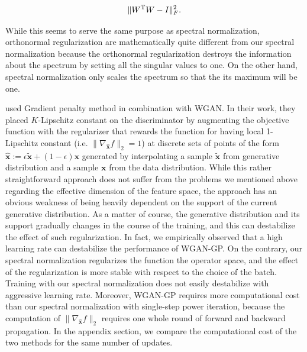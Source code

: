 \begin{align}
	\|W^{\rm T} W-I\|_F^2.
\end{align}

While this seems to serve the same purpose as spectral normalization, orthonormal regularization are mathematically quite different from our spectral normalization because the orthonormal regularization destroys the information about the spectrum by setting all the singular values to one. On the other hand, spectral normalization only scales the spectrum so that the its maximum will be one. 

\cite{gulrajani2017improved} used Gradient penalty method in combination with WGAN. In their work, they placed $K$-Lipschitz constant on the discriminator by augmenting the objective function with the regularizer that rewards the function for having local 1-Lipschitz constant (i.e. $\|\nabla_{\hat{{\bm x}}}f\|_2=1$)  at discrete sets of points of the form $\hat{{\bm x}} := \epsilon \tilde {\bm x} + (1- \epsilon) {\bm x}$ generated by interpolating a sample $\tilde {\bm x}$ from generative distribution and a sample ${\bm x}$ from the data distribution. While this rather straightforward approach does not suffer from the problems we mentioned above regarding the effective dimension of the feature space, the approach has an obvious weakness of being heavily dependent on the support of the current generative distribution. As a matter of course, the generative distribution and its support gradually changes in the course of the training, and this can destabilize the effect of such regularization. In fact, we empirically observed that a high learning rate can destabilize the performance of WGAN-GP. On the contrary, our spectral normalization regularizes the function the operator space, and the effect of the regularization is more stable with respect to the choice of the batch. Training with our spectral normalization does not easily destabilize with aggressive learning rate. Moreover, WGAN-GP requires more computational cost than our spectral normalization with single-step power iteration, because the computation of  $\|\nabla_{\hat{{\bm x}}}f\|_2$ requires one whole round of forward and backward propagation. In the appendix section, we compare the computational cost of the two methods for the same number of updates.


